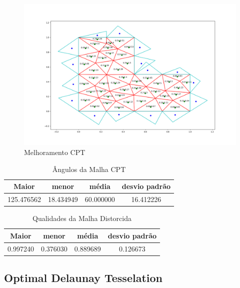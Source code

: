 \begin{figure}[ht]
    \centering
    \includegraphics[width=1\linewidth]{fig/malha-cpt.png}
    \caption{Melhoramento CPT}
    \label{fig:malha-cpt}
\end{figure}

\begin{table}[hb]
\centering
\par\caption{Ângulos da Malha CPT}
\begin{tabular}{c|c|c|c}
Maior&menor&média&desvio padrão\\\hline\hline
125.476562&18.434949&60.000000&16.412226\\\hline
\end{tabular}
\label{tab:angulos-malha-cpt}
\end{table}

\begin{table}[hb]
\centering
\par\caption{Qualidades da Malha Distorcida}
\begin{tabular}{c|c|c|c}
Maior&menor&média&desvio padrão\\\hline\hline
0.997240&0.376030&0.889689&0.126673\\\hline
\end{tabular}
\label{tab:qualidades-malha-cpt}
\end{table}

\newpage
\subsection{Optimal Delaunay Tesselation}

